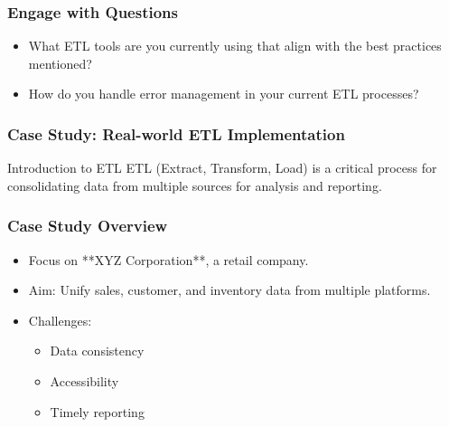 \documentclass[aspectratio=169]{beamer}
\begin{document}
\begin{frame}[fragile]
    \frametitle{Engage with Questions}
    \begin{itemize}
        \item What ETL tools are you currently using that align with the best practices mentioned?
        \item How do you handle error management in your current ETL processes?
    \end{itemize}
\end{frame}

\begin{frame}[fragile]
    \frametitle{Case Study: Real-world ETL Implementation}
    \begin{block}{Introduction to ETL}
        ETL (Extract, Transform, Load) is a critical process for consolidating data 
        from multiple sources for analysis and reporting.
    \end{block}
\end{frame}

\begin{frame}[fragile]
    \frametitle{Case Study Overview}
    \begin{itemize}
        \item Focus on **XYZ Corporation**, a retail company.
        \item Aim: Unify sales, customer, and inventory data from multiple platforms.
        \item Challenges:
        \begin{itemize}
            \item Data consistency
            \item Accessibility
            \item Timely reporting
        \end{itemize}
    \end{itemize}
\end{frame}
\end{document}
